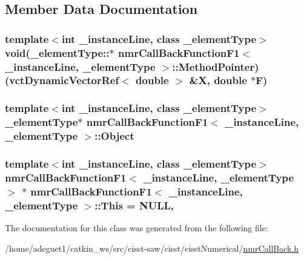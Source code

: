 \subsection{Member Data Documentation}
\hypertarget{classnmr_call_back_function_f1_a849245ab1af9c95d2ffe8717de0d70e8}{
\subsubsection[{Method\-Pointer}]{\setlength{\rightskip}{0pt plus 5cm}template$<$int \-\_\-instance\-Line, class \-\_\-element\-Type$>$ void(\-\_\-element\-Type\-::$\ast$ {\bf nmr\-Call\-Back\-Function\-F1}$<$ \-\_\-instance\-Line, \-\_\-element\-Type $>$\-::Method\-Pointer)({\bf vct\-Dynamic\-Vector\-Ref}$<$ double $>$ \&X, double $\ast$F)\hspace{0.3cm}{\ttfamily [protected]}}}\label{classnmr_call_back_function_f1_a849245ab1af9c95d2ffe8717de0d70e8}
\hypertarget{classnmr_call_back_function_f1_a65ebc32c3c8d280b0920dfbb27eb96d8}{
\subsubsection[{Object}]{\setlength{\rightskip}{0pt plus 5cm}template$<$int \-\_\-instance\-Line, class \-\_\-element\-Type$>$ \-\_\-element\-Type$\ast$ {\bf nmr\-Call\-Back\-Function\-F1}$<$ \-\_\-instance\-Line, \-\_\-element\-Type $>$\-::Object\hspace{0.3cm}{\ttfamily [protected]}}}\label{classnmr_call_back_function_f1_a65ebc32c3c8d280b0920dfbb27eb96d8}
\hypertarget{classnmr_call_back_function_f1_a9599c6b2e5c59a8bf504c59824714573}{
\subsubsection[{This}]{\setlength{\rightskip}{0pt plus 5cm}template$<$int \-\_\-instance\-Line, class \-\_\-element\-Type$>$ {\bf nmr\-Call\-Back\-Function\-F1}$<$ \-\_\-instance\-Line, \-\_\-element\-Type $>$ $\ast$ {\bf nmr\-Call\-Back\-Function\-F1}$<$ \-\_\-instance\-Line, \-\_\-element\-Type $>$\-::This = N\-U\-L\-L\hspace{0.3cm}{\ttfamily [static]}, {\ttfamily [protected]}}}\label{classnmr_call_back_function_f1_a9599c6b2e5c59a8bf504c59824714573}


The documentation for this class was generated from the following file\-:\begin{DoxyCompactItemize}
\item 
/home/adeguet1/catkin\-\_\-ws/src/cisst-\/saw/cisst/cisst\-Numerical/\hyperlink{nmr_call_back_8h}{nmr\-Call\-Back.\-h}\end{DoxyCompactItemize}

